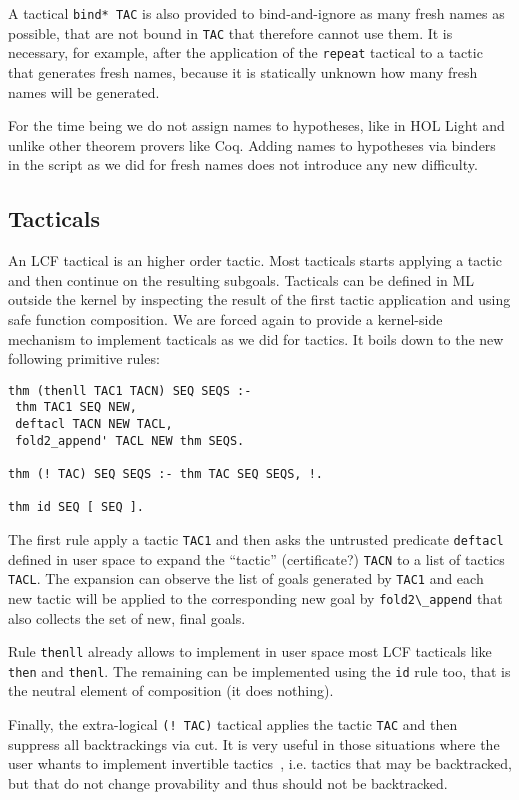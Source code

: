 \documentclass[preprint]{sigplanconf}
\begin{document}
A tactical \verb+bind* TAC+ is also provided to bind-and-ignore as many fresh names as possible, that are not bound in \verb+TAC+ that therefore cannot use them. It is necessary, for example, after the application of the \verb+repeat+ tactical to a tactic that generates fresh names, because it is statically unknown how many fresh names will be generated.

For the time being we do not assign names to hypotheses, like in HOL Light and unlike other theorem provers like Coq. Adding names to hypotheses via binders in the script as we did for fresh names does not introduce any new difficulty.

\subsection{Tacticals}
An LCF tactical is an higher order tactic. Most tacticals starts applying a tactic and then continue on the resulting subgoals. Tacticals can be defined in ML outside the kernel by inspecting the result of the first tactic application and using safe function composition. We are forced again to provide a kernel-side mechanism to implement tacticals as we did for tactics. It boils down to the new following primitive rules:

\begin{small}
\begin{verbatim}
thm (thenll TAC1 TACN) SEQ SEQS :-
 thm TAC1 SEQ NEW,
 deftacl TACN NEW TACL,
 fold2_append' TACL NEW thm SEQS.

thm (! TAC) SEQ SEQS :- thm TAC SEQ SEQS, !.

thm id SEQ [ SEQ ].
\end{verbatim}
\end{small}

The first rule apply a tactic \verb+TAC1+ and then asks the untrusted predicate \verb+deftacl+ defined in user space to expand the ``tactic'' (certificate?) \verb+TACN+ to a list of tactics \verb+TACL+. The expansion can observe the list of goals generated by \verb+TAC1+ and each new tactic will be applied to the corresponding new goal by \verb+fold2\_append+ that also collects the set of new, final goals.

Rule \verb+thenll+ already allows to implement in user space most LCF tacticals like \verb+then+ and \verb+thenl+. The remaining can be implemented using the \verb+id+ rule too, that is the neutral element of composition (it does nothing).

Finally, the extra-logical \verb+(! TAC)+ tactical applies the tactic \verb+TAC+ and then suppress all backtrackings via cut. It is very useful in those situations where the user whants to implement invertible tactics~\cite{????}, i.e. tactics that may be backtracked, but that do not change provability and thus should not be backtracked.
\end{document}
